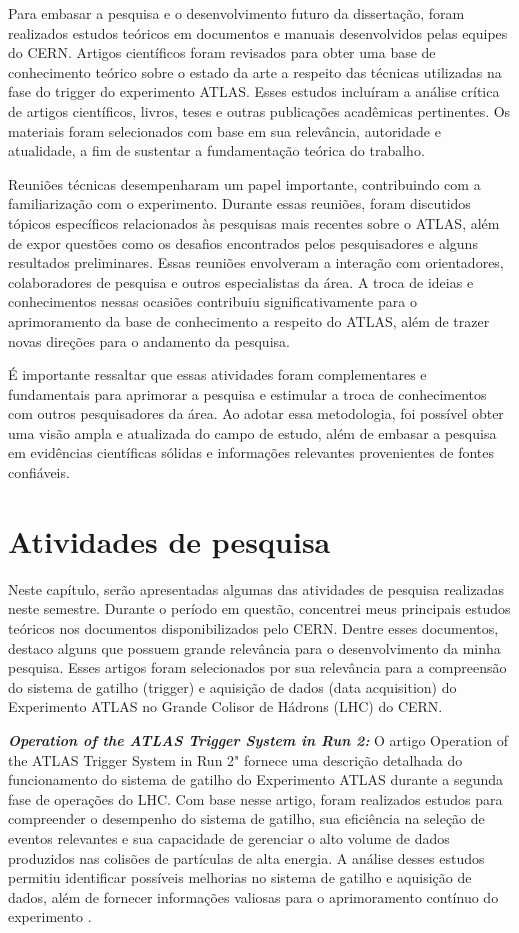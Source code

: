 Para embasar a pesquisa e o desenvolvimento futuro da dissertação, foram realizados estudos teóricos em documentos e manuais desenvolvidos pelas equipes do CERN. Artigos científicos foram revisados para obter uma base de conhecimento teórico sobre o estado da arte a respeito das técnicas utilizadas na fase do trigger do experimento ATLAS. Esses estudos incluíram a análise crítica de artigos científicos, livros, teses e outras publicações acadêmicas pertinentes. Os materiais foram selecionados com base em sua relevância, autoridade e atualidade, a fim de sustentar a fundamentação teórica do trabalho.

Reuniões técnicas desempenharam um papel importante, contribuindo com a familiarização com o experimento. Durante essas reuniões, foram discutidos tópicos específicos relacionados às pesquisas mais recentes sobre o ATLAS, além de expor questões como os desafios encontrados pelos pesquisadores e alguns resultados preliminares. Essas reuniões envolveram a interação com orientadores, colaboradores de pesquisa e outros especialistas da área. A troca de ideias e conhecimentos nessas ocasiões contribuiu significativamente para o aprimoramento da base de conhecimento a respeito do ATLAS, além de trazer novas direções para o andamento da pesquisa.

É importante ressaltar que essas atividades foram complementares e fundamentais para aprimorar a pesquisa e estimular a troca de conhecimentos com outros pesquisadores da área. Ao adotar essa metodologia, foi possível obter uma visão ampla e atualizada do campo de estudo, além de embasar a pesquisa em evidências científicas sólidas e informações relevantes provenientes de fontes confiáveis.


\section{Atividades de pesquisa}\label{cap:pesquisa}
Neste capítulo, serão apresentadas algumas das atividades de pesquisa realizadas neste semestre. Durante o período em questão, concentrei meus principais estudos teóricos nos documentos disponibilizados pelo CERN. Dentre esses documentos, destaco alguns que possuem grande relevância para o desenvolvimento da minha pesquisa. Esses artigos foram selecionados por sua relevância para a compreensão do sistema de gatilho (trigger) e aquisição de dados (data acquisition) do Experimento ATLAS no Grande Colisor de Hádrons (LHC) do CERN.


\textit{\textbf{Operation of the ATLAS Trigger System in Run 2:}} O artigo Operation of the ATLAS Trigger System in Run 2" fornece uma descrição detalhada do funcionamento do sistema de gatilho do Experimento ATLAS durante a segunda fase de operações do LHC. Com base nesse artigo, foram realizados estudos para compreender o desempenho do sistema de gatilho, sua eficiência na seleção de eventos relevantes e sua capacidade de gerenciar o alto volume de dados produzidos nas colisões de partículas de alta energia. A análise desses estudos permitiu identificar possíveis melhorias no sistema de gatilho e aquisição de dados, além de fornecer informações valiosas para o aprimoramento contínuo do experimento \cite{The_ATLAS_collaboration_2020}.

